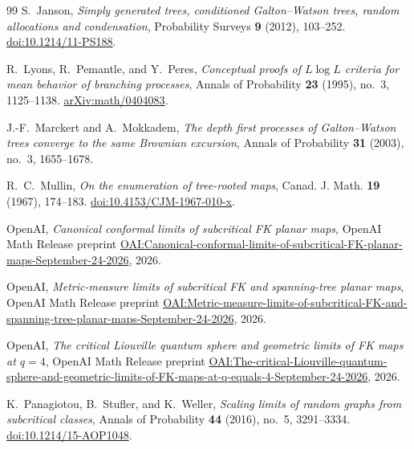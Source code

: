 \begin{thebibliography}{99}
S.~Janson,
\emph{Simply generated trees, conditioned Galton--Watson trees, random allocations and condensation},
Probability Surveys \textbf{9} (2012), 103--252.
\href{https://doi.org/10.1214/11-PS188}{doi:10.1214/11-PS188}.

R.~Lyons, R.~Pemantle, and Y.~Peres,
\emph{Conceptual proofs of $L\log L$ criteria for mean behavior of branching processes},
Annals of Probability \textbf{23} (1995), no.~3, 1125--1138.
\href{https://arxiv.org/abs/math/0404083}{arXiv:math/0404083}.

J.-F.~Marckert and A.~Mokkadem,
\emph{The depth first processes of Galton--Watson trees converge to the same Brownian excursion},
Annals of Probability \textbf{31} (2003), no.~3, 1655--1678.

R.~C.~Mullin,
\emph{On the enumeration of tree-rooted maps},
Canad. J. Math. \textbf{19} (1967), 174--183.
\href{https://doi.org/10.4153/CJM-1967-010-x}{doi:10.4153/CJM-1967-010-x}.

OpenAI,
\emph{Canonical conformal limits of subcritical FK planar maps},
OpenAI Math Release preprint
\href{https://github.com/openai/math/blob/main/preprints/Canonical-conformal-limits-of-subcritical-FK-planar-maps-September-24-2026/main.pdf}{OAI:Canonical-conformal-limits-of-subcritical-FK-planar-maps-September-24-2026},
2026.

OpenAI,
\emph{Metric-measure limits of subcritical FK and spanning-tree planar maps},
OpenAI Math Release preprint
\href{https://github.com/openai/math/blob/main/preprints/Metric-measure-limits-of-subcritical-FK-and-spanning-tree-planar-maps-September-24-2026/main.pdf}{OAI:Metric-measure-limits-of-subcritical-FK-and-spanning-tree-planar-maps-September-24-2026},
2026.

OpenAI,
\emph{The critical Liouville quantum sphere and geometric limits of FK maps at $q=4$},
OpenAI Math Release preprint
\href{https://github.com/openai/math/blob/main/preprints/The-critical-Liouville-quantum-sphere-and-geometric-limits-of-FK-maps-at-q-equals-4-September-24-2026/main.pdf}{OAI:The-critical-Liouville-quantum-sphere-and-geometric-limits-of-FK-maps-at-q-equals-4-September-24-2026},
2026.

K.~Panagiotou, B.~Stufler, and K.~Weller,
\emph{Scaling limits of random graphs from subcritical classes},
Annals of Probability \textbf{44} (2016), no.~5, 3291--3334.
\href{https://doi.org/10.1214/15-AOP1048}{doi:10.1214/15-AOP1048}.


\end{thebibliography}
